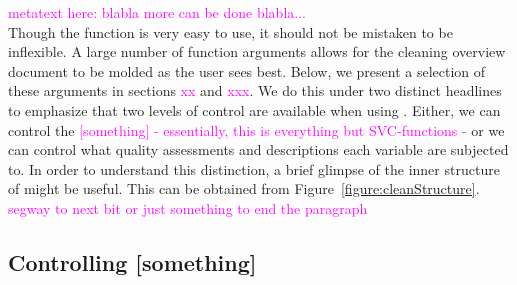 \documentclass[article]{jss}
\newcommand{\hl}[1]{\textcolor{magenta}{#1}}
\newcommand{\R}[1]{\code{#1}}
\begin{document}
\hl{metatext here: blabla more can be done blabla...} \\

Though the \R{clean()} function is very easy to use, it should not be mistaken to be inflexible. A large number of function arguments allows for the cleaning overview document to be molded as the user sees best. Below, we present a selection of these arguments in sections \hl{xx} and \hl{xxx}. We do this under two distinct headlines to emphasize that two levels of control are available when using \R{clean()}. Either, we can control the \hl{[something] - essentially, this is everything but SVC-functions - } or we can control what quality assessments and descriptions each variable are subjected to. In order to understand this distinction, a brief glimpse of the inner structure of \R{clean()} might be useful. This can be obtained from Figure~\ref{figure:cleanStructure}. \hl{segway to next bit or just something to end the paragraph}









\subsection{Controlling [something]}
\label{subsection:controlSomething}
\end{document}
